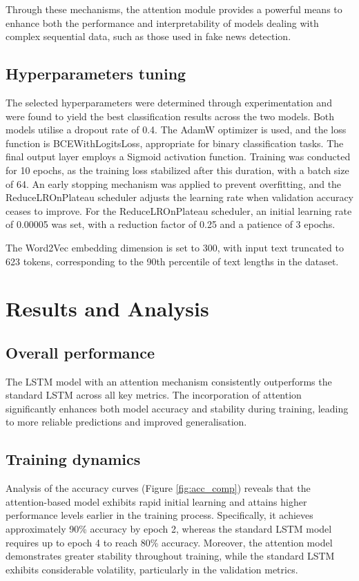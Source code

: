 \documentclass[sn-mathphys-ay, Numbered]{sn-jnl}
\theoremstyle{thmstyleone}%
\theoremstyle{thmstyletwo}%
\theoremstyle{thmstylethree}%
\begin{document}
Through these mechanisms, the attention module provides a powerful means to enhance both the performance and interpretability of models dealing with complex sequential data, such as those used in fake news detection.

\subsection{Hyperparameters tuning}
The selected hyperparameters were determined through experimentation and were found to yield the best classification results across the two models. Both models utilise a dropout rate of 0.4. The AdamW optimizer is used, and the loss function is BCEWithLogitsLoss, appropriate for binary classification tasks. The final output layer employs a Sigmoid activation function. Training was conducted for 10 epochs, as the training loss stabilized after this duration, with a batch size of 64. An early stopping mechanism was applied to prevent overfitting, and the ReduceLROnPlateau scheduler adjusts the learning rate when validation accuracy ceases to improve. For the ReduceLROnPlateau scheduler, an initial learning rate of 0.00005 was set, with a reduction factor of 0.25 and a patience of 3 epochs.

The Word2Vec embedding dimension is set to 300, with input text truncated to 623 tokens, corresponding to the 90th percentile of text lengths in the dataset.
\section{Results and Analysis}
\subsection{Overall performance}
The LSTM model with an attention mechanism consistently outperforms the standard LSTM across all key metrics. The incorporation of attention significantly enhances both model accuracy and stability during training, leading to more reliable predictions and improved generalisation.
\subsection{Training dynamics}
Analysis of the accuracy curves (Figure \ref{fig:acc_comp}) reveals that the attention-based model exhibits rapid initial learning and attains higher performance levels earlier in the training process. Specifically, it achieves approximately 90\% accuracy by epoch 2, whereas the standard LSTM model requires up to epoch 4 to reach 80\% accuracy. Moreover, the attention model demonstrates greater stability throughout training, while the standard LSTM exhibits considerable volatility, particularly in the validation metrics.
\end{document}
